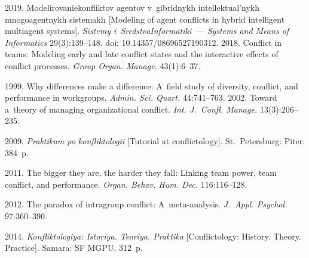   

\vspace*{4pt}

  \begin{multicols}{2}

\renewcommand{\bibname}{\protect\rmfamily References}

{\small\frenchspacing
 {%
 \begin{thebibliography}{99} 
    2019. Mo\-de\-li\-ro\-va\-nie\linebreak konfliktov agen\-tov v~gib\-rid\-nykh 
in\-tel\-lek\-tu\-al'\-nykh mno\-go\-agent\-nykh sis\-te\-makh [Modeling of agent conflicts in hybrid intelligent multiagent 
systems]. \textit{Sis\-te\-my i~Sredstva\linebreak Informatiki~--- Systems and Means of Informatics} 29(3):139--148. doi: 10.14357/08696527190312.
    2018. Conflict in teams: 
Modeling early and late conflict states and the interactive effects of conflict processes. \textit{Group  
Organ. Manage.} 43(1):6--37.
  
  
  


    1999. Why differences make a difference: 
A~field study of diversity, conflict, and performance in workgroups. \textit{Admin. Sci. 
Quart.} 44:741--763.
    2002. Toward a~theory of managing organizational conflict. \textit{Int.  
J.~Confl. Manage.} 13(3):206--235.

    2009. \textit{Praktikum po konfliktologii} [Tutorial at conflictology]. St.\ 
Petersburg: Piter. 384~p. 

    2011. The bigger they are, the harder they fall: 
Linking team power, team conflict, and performance. \textit{Organ. Behav. Hum. Dec.} 116:116--128.
  
  
    2012. The paradox of intragroup conflict: 
A~meta-analysis. \textit{J.~Appl. Psychol.} 97:360--390.

    2014. \textit{Konfliktologiya: Istoriya. Teoriya. Praktika} [Conflictology: 
History. Theory. Practice]. Samara: SF MGPU. 312~p.


\end{thebibliography}}}
\end{multicols}
